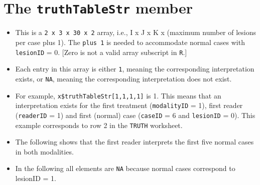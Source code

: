 \documentclass[
]{book}
\newenvironment{Shaded}{\begin{snugshade}}{\end{snugshade}}
\newcommand{\CommentTok}[1]{\textcolor[rgb]{0.56,0.35,0.01}{\textit{#1}}}
\newcommand{\DecValTok}[1]{\textcolor[rgb]{0.00,0.00,0.81}{#1}}
\newcommand{\NormalTok}[1]{#1}
\newcommand{\OperatorTok}[1]{\textcolor[rgb]{0.81,0.36,0.00}{\textbf{#1}}}
\providecommand{\tightlist}{%
  \setlength{\itemsep}{0pt}\setlength{\parskip}{0pt}}
\begin{document}
\hypertarget{the-truthtablestr-member}{%
\section{\texorpdfstring{The \texttt{truthTableStr} member}{The truthTableStr member}}\label{the-truthtablestr-member}}

\begin{itemize}
\tightlist
\item
  This is a \texttt{2\ x\ 3\ x\ 30\ x\ 2} array, i.e., I x J x K x (maximum number of lesions per case plus 1). The \texttt{plus\ 1} is needed to accommodate normal cases with \texttt{lesionID} = 0. {[}Zero is not a valid array subscript in \texttt{R}.{]}
\item
  Each entry in this array is either \texttt{1}, meaning the corresponding interpretation exists, or \texttt{NA}, meaning the corresponding interpretation does not exist.
\item
  For example, \texttt{x\$truthTableStr{[}1,1,1,1{]}} is 1. This means that an interpretation exists for the first treatment (\texttt{modalityID} = 1), first reader (\texttt{readerID} = 1) and first (normal) case (\texttt{caseID} = 6 and \texttt{lesionID} = 0). This example corresponds to row 2 in the \texttt{TRUTH} worksheet.
\item
  The following shows that the first reader interprets the first five normal cases in both modalities.
\end{itemize}

\begin{Shaded}
\end{Shaded}

\begin{itemize}
\tightlist
\item
  In the following all elements are \texttt{NA} because normal cases correspond to lesionID = 1.
\end{itemize}
\end{document}
